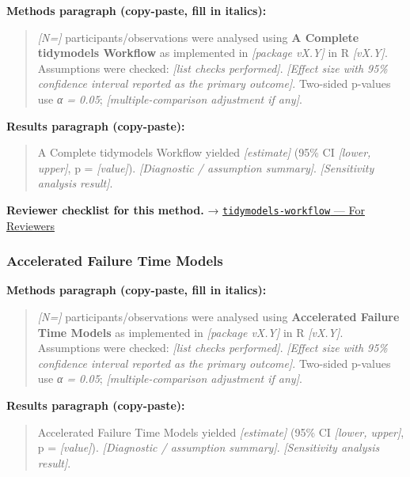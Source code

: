 \documentclass[
]{article}
\begin{document}
\textbf{Methods paragraph (copy-paste, fill in italics):}

\begin{quote}
\emph{{[}N={]}} participants/observations were analysed using \textbf{A
Complete tidymodels Workflow} as implemented in \emph{{[}package
vX.Y{]}} in R \emph{{[}vX.Y{]}}. Assumptions were checked: \emph{{[}list
checks performed{]}}. \emph{{[}Effect size with 95\% confidence interval
reported as the primary outcome{]}}. Two-sided p-values use \emph{α =
0.05}; \emph{{[}multiple-comparison adjustment if any{]}}.
\end{quote}

\textbf{Results paragraph (copy-paste):}

\begin{quote}
A Complete tidymodels Workflow yielded \emph{{[}estimate{]}} (95\% CI
\emph{{[}lower, upper{]}}, p = \emph{{[}value{]}}). \emph{{[}Diagnostic
/ assumption summary{]}}. \emph{{[}Sensitivity analysis result{]}}.
\end{quote}

\textbf{Reviewer checklist for this method.} →
\href{../chapters/13-ml/tidymodels-workflow.Rmd\#for-reviewers}{\texttt{tidymodels-workflow}
--- For Reviewers}

\subsubsection{Accelerated Failure Time
Models}\label{accelerated-failure-time-models}

\textbf{Methods paragraph (copy-paste, fill in italics):}

\begin{quote}
\emph{{[}N={]}} participants/observations were analysed using
\textbf{Accelerated Failure Time Models} as implemented in
\emph{{[}package vX.Y{]}} in R \emph{{[}vX.Y{]}}. Assumptions were
checked: \emph{{[}list checks performed{]}}. \emph{{[}Effect size with
95\% confidence interval reported as the primary outcome{]}}. Two-sided
p-values use \emph{α = 0.05}; \emph{{[}multiple-comparison adjustment if
any{]}}.
\end{quote}

\textbf{Results paragraph (copy-paste):}

\begin{quote}
Accelerated Failure Time Models yielded \emph{{[}estimate{]}} (95\% CI
\emph{{[}lower, upper{]}}, p = \emph{{[}value{]}}). \emph{{[}Diagnostic
/ assumption summary{]}}. \emph{{[}Sensitivity analysis result{]}}.
\end{quote}
\end{document}
